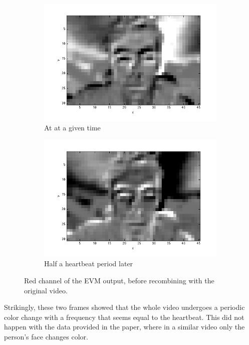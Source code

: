\documentclass[12pt]{article}
\begin{document}
  \begin{figure}
    \begin{subfigure}{.5\textwidth}
      \captionsetup{justification=centering}
      \includegraphics[width=\textwidth]{images/red_peak.png}
      \caption{At at a given time}
    \end{subfigure}
    \begin{subfigure}{.5\textwidth}
      \captionsetup{justification=centering}
      \includegraphics[width=\textwidth]{images/red_trough.png}
      \caption{Half a heartbeat period later}
    \end{subfigure}
    \captionsetup{justification=centering}
    \caption{Red channel of the EVM output, before recombining with the original video.}
  \end{figure}

Strikingly, these two frames showed that the whole video undergoes a periodic color change with a frequency 
  that seems equal to the heartbeat. This did not happen with the data provided in the paper, 
  where in a similar video only the person's face changes color.
\end{document}
